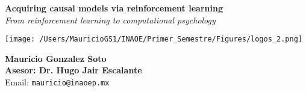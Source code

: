 \documentclass[a0,portrait]{a0poster}
\begin{document}


\begin{minipage}[b]{0.45\linewidth}
\begin{flushleft}
\LARGE \color{NavyBlue} \textbf{ Acquiring causal models via reinforcement learning} \color{Black}\\ %
\Large\textit{From reinforcement learning to computational psychology}\\ %
\end{flushleft}
\end{minipage}
%
\begin{minipage}[b]{0.20\linewidth}
\begin{center}
\texttt{[image: /Users/MauricioGS1/INAOE/Primer\_Semestre/Figures/logos\_2.png]}
\end{center}
\end{minipage}
%
\begin{minipage}[b]{0.30\linewidth}
\begin{center}
\large \textbf{Mauricio Gonzalez Soto}\\ %
\large \textbf{Asesor: Dr. Hugo Jair Escalante}\\
Email: \texttt{mauricio@inaoep.mx}
\end{center}
\end{minipage}

\vspace{0.3cm} %

\end{document}
